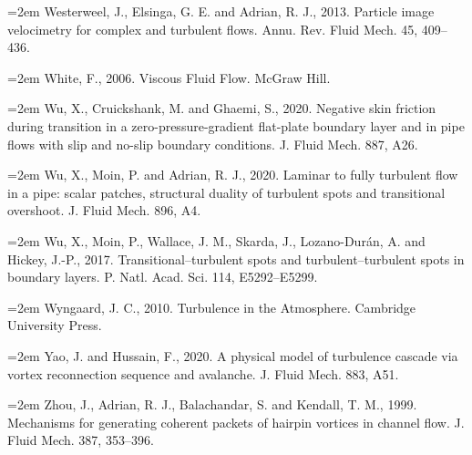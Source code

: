 \documentclass[12pt,a4paper,openany,fontset=none]{ctexbook}
\begin{document}
\par\hangindent=2em Westerweel, J., Elsinga, G. E. and Adrian, R. J., 2013. Particle image velocimetry for complex and turbulent flows. Annu. Rev. Fluid Mech. 45, 409–436.
\par\hangindent=2em White, F., 2006. Viscous Fluid Flow. McGraw Hill.
\par\hangindent=2em Wu, X., Cruickshank, M. and Ghaemi, S., 2020. Negative skin friction during transition in a zero-pressure-gradient flat-plate boundary layer and in pipe flows with slip and no-slip boundary conditions. J. Fluid Mech. 887, A26.
\par\hangindent=2em Wu, X., Moin, P. and Adrian, R. J., 2020. Laminar to fully turbulent flow in a pipe: scalar patches, structural duality of turbulent spots and transitional overshoot. J. Fluid Mech. 896, A4.
\par\hangindent=2em Wu, X., Moin, P., Wallace, J. M., Skarda, J., Lozano-Durán, A. and Hickey, J.-P., 2017. Transitional–turbulent spots and turbulent–turbulent spots in boundary layers. P. Natl. Acad. Sci. 114, E5292–E5299.
\par\hangindent=2em Wyngaard, J. C., 2010. Turbulence in the Atmosphere. Cambridge University Press.
\par\hangindent=2em Yao, J. and Hussain, F., 2020. A physical model of turbulence cascade via vortex reconnection sequence and avalanche. J. Fluid Mech. 883, A51.
\par\hangindent=2em Zhou, J., Adrian, R. J., Balachandar, S. and Kendall, T. M., 1999. Mechanisms for generating coherent packets of hairpin vortices in channel flow. J. Fluid Mech. 387, 353–396.
\end{document}
